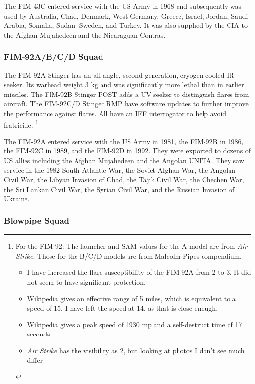 \documentclass[10pt]{article}
\newcommand{\note}[1]{%
    \footnote{%
        \setlength{\parindent}{0pt}%
        \setlength{\parskip}{\smallskipamount}%
        #1
    }%
}
\begin{document}
The FIM-43C entered service with the US Army in 1968 and subsequently was used by Australia, Chad, Denmark, West Germany, Greece, Israel, Jordan, Saudi Arabia, Somalia, Sudan, Sweden, and Turkey. It was also supplied by the CIA to the Afghan Mujahedeen and the Nicaraguan Contras.

\subsubsection{FIM-92A/B/C/D Squad}

The FIM-92A Stinger has an all-angle, second-generation, cryogen-cooled IR seeker.
Its warhead weight 3 kg and was significantly more lethal than in earlier missiles.
The FIM-92B Stinger POST adds a UV seeker to distinguish flares from aircraft.
The FIM-92C/D Stinger RMP have software updates to further improve the performance against flares.
All have an IFF interrogator to help avoid fratricide.%
\note{
    For the FIM-92: The launcher and SAM values for the A model are from \emph{Air Strike}. Those for the B/C/D models are from Malcolm Pipes compendium.
    \begin{itemize}
        \item I have increased the flare susceptibility of the FIM-92A from 2 to 3. It did not seem to have significant protection.
        \item Wikipedia gives an effective range of 5 miles, which is equivalent to a speed of 15. I have left the speed at 14, as that is close enough.
        \item Wikipedia gives a peak speed of 1930 mp and a self-destruct time of 17 seconds.
        \item \emph{Air Strike} has the visibility as 2, but looking at photos I don't see much differ
    \end{itemize}
}

The FIM-92A entered service with the US Army in 1981, the FIM-92B in 1986, the FIM-92C in 1989, and the FIM-92D in 1992. They were exported to dozens of US allies including the Afghan Mujahedeen and the Angolan UNITA. They saw service in the 1982 South Atlantic War, the Soviet-Afghan War, the Angolan Civil War, the Libyan Invasion of Chad, the Tajik Civil War, the Chechen War, the Sri Lankan Civil War, the Syrian Civil War, and the Russian Invasion of Ukraine.

\subsubsection{Blowpipe Squad}
\end{document}
